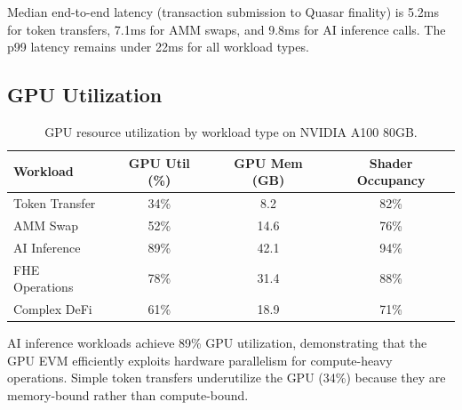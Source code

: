 Median end-to-end latency (transaction submission to Quasar finality) is 5.2ms for token transfers, 7.1ms for AMM swaps, and 9.8ms for AI inference calls. The p99 latency remains under 22ms for all workload types.

\subsection{GPU Utilization}

\begin{table}[t]
\centering
\begin{tabular}{lccc}
\toprule
\textbf{Workload} & \textbf{GPU Util (\%)} & \textbf{GPU Mem (GB)} & \textbf{Shader Occupancy} \\
\midrule
Token Transfer & 34\% & 8.2 & 82\% \\
AMM Swap & 52\% & 14.6 & 76\% \\
AI Inference & 89\% & 42.1 & 94\% \\
FHE Operations & 78\% & 31.4 & 88\% \\
Complex DeFi & 61\% & 18.9 & 71\% \\
\bottomrule
\end{tabular}
\caption{GPU resource utilization by workload type on NVIDIA A100 80GB.}
\label{tab:gpu}
\end{table}

AI inference workloads achieve 89\% GPU utilization, demonstrating that the GPU EVM efficiently exploits hardware parallelism for compute-heavy operations. Simple token transfers underutilize the GPU (34\%) because they are memory-bound rather than compute-bound.

